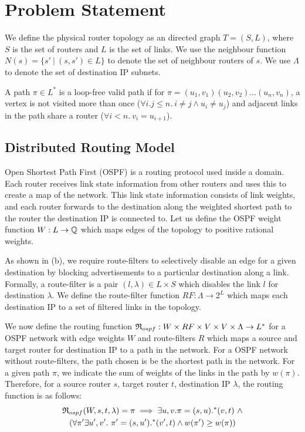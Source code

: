 \section{Problem Statement}
We define the physical router topology as an directed graph $T=(S, L)$,
where $S$ is the set of routers and $L$ is the set of links. 
We use the neighbour function $N(s) = \{s'\ | \ (s,s') \in L \}$ to denote 
the set of neighbour routers of $s$. 
We use $\Lambda$ to denote the set of destination IP subnets.

A path $\pi \in L^*$ is a loop-free valid path if for 
$\pi = (u_1,v_1) (u_2, v_2) \ldots (u_n, v_n)$, a 
vertex is not visited more than once ($\forall i.j \leq n. 
~i \not= j \wedge u_i \not= u_j$) and adjacent links in the
path share a router ($\forall i < n. ~v_i = u_{i+1}$).

\subsection{Distributed Routing Model}
Open Shortest Path First (OSPF) is a routing protocol used inside a
domain. Each router receives link state information from other routers
and uses this to create a map of the network. This link state
information consists of link weights, and each router
forwards to the destination along the weighted shortest path 
to the router the destination IP is connected to. Let us
define the OSPF weight function $W: L \rightarrow \mathbb{Q}$ which 
maps edges of the topology to positive rational weights. 

As shown in (b), 
we require route-filters
to selectively disable an
edge for a given destination by  
blocking advertisements to a
particular destination along a link. 
Formally, a route-filter is a pair $(l,\lambda)\in L\times S$
which disables the link $l$ for destination $\lambda$. 
We define the route-filter function 
$RF: \Lambda \rightarrow 2^L$ which maps each destination IP
to a set of filtered links in the topology. 

We now define the routing function 
$\mathfrak{R}_{ospf}: W \times RF \times V \times V \times \Lambda \rightarrow L^*$ 
for a OSPF network with edge weights $W$ and route-filters
$R$ which maps a source and target router
for destination IP to a path in the network. For a 
OSPF network without route-filters, the path chosen is
be the shortest path in the network. 
For a given
path $\pi$, we indicate the sum of weights of the
links in the path by $w(\pi)$. Therefore, for a
source router $s$, target router $t$, destination IP 
$\lambda$, the routing function is as follows:
\begin{multline}
	\mathfrak{R}_{ospf}(W,s,t,\lambda) = \pi \implies \exists u,v. \pi=(s,u).^*(v,t) ~\wedge\\ 
	(\forall \pi' \exists u',v'. ~\pi'=(s,u').^*(v',t) \wedge w(\pi') \geq w(\pi))
\end{multline}

